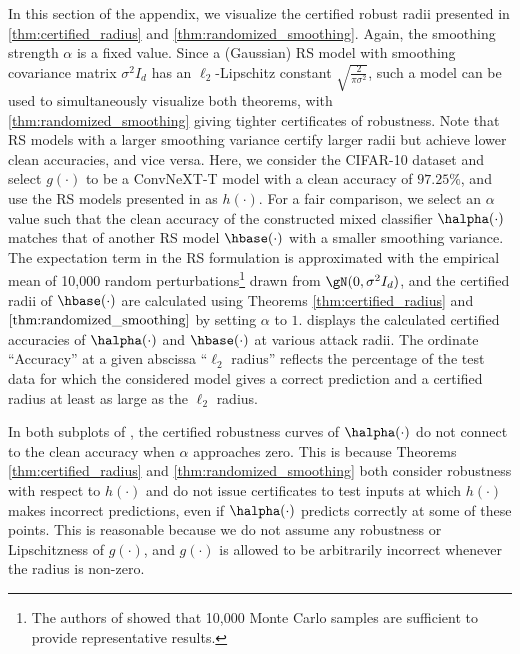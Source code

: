 \documentclass[11pt, letterpaper]{article}
\theoremstyle{plain}
\theoremstyle{definition}
\begin{document}
In this section of the appendix, we visualize the certified robust radii presented in \cref{thm:certified_radius} and \cref{thm:randomized_smoothing}. Again, the smoothing strength $\alpha$ is a fixed value. Since a (Gaussian) RS model with smoothing covariance matrix $\sigma^2 I_d$ has an $\ell_2$-Lipschitz constant $\sqrt{\frac{2}{\pi\sigma^2}}$, such a model can be used to simultaneously visualize both theorems, with \cref{thm:randomized_smoothing} giving tighter certificates of robustness. Note that RS models with a larger smoothing variance certify larger radii but achieve lower clean accuracies, and vice versa. Here, we consider the CIFAR-10 dataset and select $g (\cdot)$ to be a ConvNeXT-T model with a clean accuracy of $97.25\%$, and use the RS models presented in \citep{Zhang19} as $h (\cdot)$. For a fair comparison, we select an $\alpha$ value such that the clean accuracy of the constructed mixed classifier $\halpha (\cdot)$ matches that of another RS model $\hbase (\cdot)$ with a smaller smoothing variance. The expectation term in the RS formulation is approximated with the empirical mean of 10,000 random perturbations\footnote{The authors of \citep{Cohen19} showed that 10,000 Monte Carlo samples are sufficient to provide representative results.} drawn from $\gN(0, \sigma^2 I_d)$, and the certified radii of $\hbase(\cdot)$ are calculated using Theorems \ref{thm:certified_radius} and $\ref{thm:randomized_smoothing}$ by setting $\alpha$ to $1$.  displays the calculated certified accuracies of $\halpha (\cdot)$ and $\hbase (\cdot)$ at various attack radii. The ordinate ``Accuracy'' at a given abscissa ``$\ell_2$ radius'' reflects the percentage of the test data for which the considered model gives a correct prediction and a certified radius at least as large as the $\ell_2$ radius.

In both subplots of , the certified robustness curves of $\halpha (\cdot)$ do not connect to the clean accuracy when $\alpha$ approaches zero. This is because Theorems \ref{thm:certified_radius} and \ref{thm:randomized_smoothing} both consider robustness with respect to $h (\cdot)$ and do not issue certificates to test inputs at which $h (\cdot)$ makes incorrect predictions, even if $\halpha (\cdot)$ predicts correctly at some of these points. This is reasonable because we do not assume any robustness or Lipschitzness of $g (\cdot)$, and $g (\cdot)$ is allowed to be arbitrarily incorrect whenever the radius is non-zero.
\end{document}
